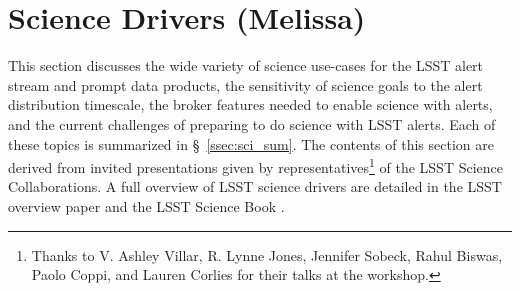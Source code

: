 
\section{Science Drivers (Melissa)} \label{sec:science}





\medskip
This section discusses the wide variety of science use-cases for the  {LSST} alert stream and prompt data products, the sensitivity of science goals to the alert distribution timescale, the broker features needed to enable science with alerts, and the current challenges of preparing to do science with  {LSST} alerts.
Each of these topics is summarized in \S~\ref{ssec:sci_sum}.
The contents of this section are derived from invited presentations given by representatives\footnote{Thanks to V. Ashley Villar, R. Lynne Jones, Jennifer Sobeck, Rahul Biswas, Paolo Coppi, and Lauren Corlies for their talks at the workshop.} of the  {LSST} Science Collaborations. 
A full overview of  {LSST} science drivers are detailed in the  {LSST} overview paper \citep{2019ApJ...873..111I} and the  {LSST} Science Book \citep{2009arXiv0912.0201L}. 

